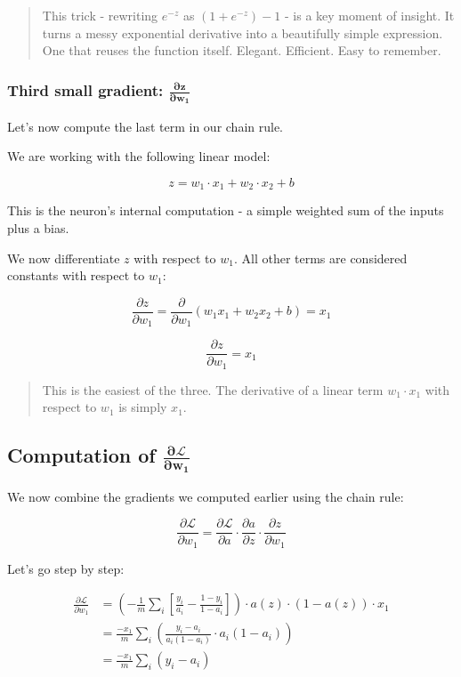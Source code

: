 \documentclass[11pt]{article}
\begin{document}
\begin{quote}
This trick - rewriting \( e^{-z} \) as \( (1 + e^{-z}) - 1 \) - is a key moment of insight.  
It turns a messy exponential derivative into a beautifully simple expression.  
One that reuses the function itself. Elegant. Efficient. Easy to remember.
\end{quote}

\subsubsection*{Third small gradient: $\boldsymbol{\frac{\partial z}{\partial w_1}}$}

Let's now compute the last term in our chain rule.

We are working with the following linear model:

\[
z = w_1 \cdot x_1 + w_2 \cdot x_2 + b
\]

This is the neuron's internal computation - a simple weighted sum of the inputs plus a bias.

We now differentiate $z$ with respect to $w_1$. All other terms are considered constants with respect to $w_1$:

\[
\frac{\partial z}{\partial w_1} = \frac{\partial}{\partial w_1} \left( w_1 x_1 + w_2 x_2 + b \right) = x_1
\]

\begin{tcolorbox}[colback=gray!5, colframe=gray!50!black]
\[
\boxed{ \frac{\partial z}{\partial w_1} = x_1 }
\]
\end{tcolorbox}

\begin{quote}
This is the easiest of the three. The derivative of a linear term $w_1 \cdot x_1$ with respect to $w_1$ is simply $x_1$.
\end{quote}


\subsection*{Computation of $\boldsymbol{\frac{\partial \mathcal{L}}{\partial w_1}}$}

We now combine the gradients we computed earlier using the chain rule:

\[
\frac{\partial \mathcal{L}}{\partial w_1} 
= \frac{\partial \mathcal{L}}{\partial a} \cdot \frac{\partial a}{\partial z} \cdot \frac{\partial z}{\partial w_1}
\]

Let's go step by step:

\[
\begin{aligned}
\frac{\partial \mathcal{L}}{\partial w_1} 
&= \left(-\frac{1}{m} \sum_i \left[ \frac{y_i}{a_i} - \frac{1 - y_i}{1 - a_i} \right] \right) 
   \cdot a(z) \cdot (1 - a(z)) \cdot x_1 \\
&= \frac{-x_1}{m} \sum_i \left( \frac{y_i - a_i}{a_i(1 - a_i)} \cdot a_i(1 - a_i) \right) \\
&= \frac{-x_1}{m} \sum_i (y_i - a_i)
\end{aligned}
\]
\end{document}
